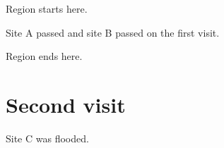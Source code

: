 \documentclass[11pt]{article}
\begin{document}
Region starts here.

Site A passed \checkmark{} and site B passed \checkmark{} on the first visit.

Region ends here.

\section{Second visit}
Site C was flooded.
\end{document}
